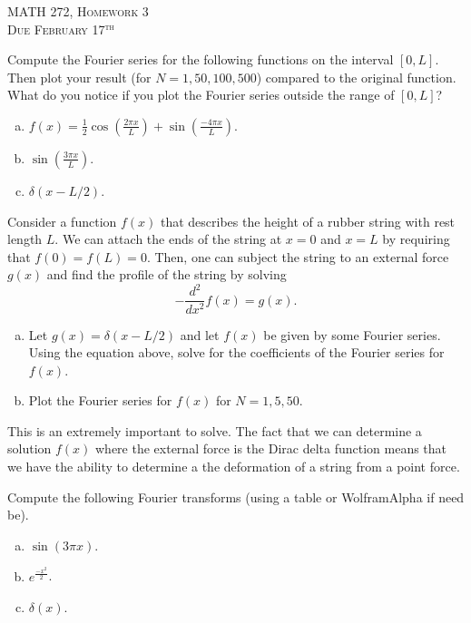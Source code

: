 \documentclass[12pt]{article} %
\begin{document}
\begin{center}
   \textsc{\large MATH 272, Homework 3}\\
   \textsc{Due February 17$^\textrm{th}$}
\end{center}
\vspace{.5cm}


\begin{problem}
Compute the Fourier series for the following functions on the interval $[0,L]$. Then plot your result (for $N=1,50,100,500$) compared to the original function. What do you notice if you plot the Fourier series outside the range of $[0,L]$?
\begin{enumerate}[(a)]
	\item $f(x)=\frac{1}{2}\cos\left(\frac{2\pi x}{L}\right)+\sin\left(\frac{-4\pi x}{L}\right)$.
	\item $\sin\left(\frac{3\pi x}{L}\right)$.
	\item $\delta(x-L/2)$.
\end{enumerate}
\end{problem}

\begin{problem}
Consider a function $f(x)$ that describes the height of a rubber string with rest length $L$. We can attach the ends of the string at $x=0$ and $x=L$ by requiring that $f(0)=f(L)=0$.  Then, one can subject the string to an external force $g(x)$ and find the profile of the string by solving
\[
-\frac{d^2}{dx^2} f(x) = g(x).
\]
\begin{enumerate}[(a)]
	\item Let $g(x)=\delta(x-L/2)$ and let $f(x)$ be given by some Fourier series.  Using the equation above, solve for the coefficients of the Fourier series for $f(x)$.
	\item Plot the Fourier series for $f(x)$ for $N=1,5,50$.
\end{enumerate}
This is an extremely important to solve. The fact that we can determine a solution $f(x)$ where the external force is the Dirac delta function means that we have the ability to determine a the deformation of a string from a point force.
\end{problem}


\begin{problem}
Compute the following Fourier transforms (using a table or WolframAlpha if need be).  
\begin{enumerate}[(a)]
	\item $\sin(3\pi x)$.
	\item $e^{\frac{-x^2}{2}}$.
	\item $\delta(x)$.
\end{enumerate}
\end{problem}
\end{document}
